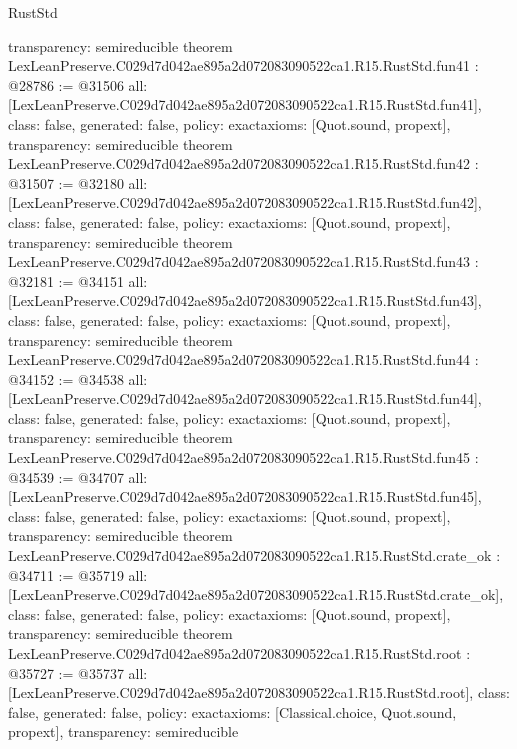 \begin{lexlean}{RustStd}
\begin{coremodule}
{  transparency: semireducible
}
theorem LexLeanPreserve.C029d7d042ae895a2d072083090522ca1.R15.RustStd.fun41 : @28786 := @31506 {
  all: [LexLeanPreserve.C029d7d042ae895a2d072083090522ca1.R15.RustStd.fun41],
  class: false,
  generated: false,
  policy: exact{axioms: [Quot.sound, propext]},
  transparency: semireducible
}
theorem LexLeanPreserve.C029d7d042ae895a2d072083090522ca1.R15.RustStd.fun42 : @31507 := @32180 {
  all: [LexLeanPreserve.C029d7d042ae895a2d072083090522ca1.R15.RustStd.fun42],
  class: false,
  generated: false,
  policy: exact{axioms: [Quot.sound, propext]},
  transparency: semireducible
}
theorem LexLeanPreserve.C029d7d042ae895a2d072083090522ca1.R15.RustStd.fun43 : @32181 := @34151 {
  all: [LexLeanPreserve.C029d7d042ae895a2d072083090522ca1.R15.RustStd.fun43],
  class: false,
  generated: false,
  policy: exact{axioms: [Quot.sound, propext]},
  transparency: semireducible
}
theorem LexLeanPreserve.C029d7d042ae895a2d072083090522ca1.R15.RustStd.fun44 : @34152 := @34538 {
  all: [LexLeanPreserve.C029d7d042ae895a2d072083090522ca1.R15.RustStd.fun44],
  class: false,
  generated: false,
  policy: exact{axioms: [Quot.sound, propext]},
  transparency: semireducible
}
theorem LexLeanPreserve.C029d7d042ae895a2d072083090522ca1.R15.RustStd.fun45 : @34539 := @34707 {
  all: [LexLeanPreserve.C029d7d042ae895a2d072083090522ca1.R15.RustStd.fun45],
  class: false,
  generated: false,
  policy: exact{axioms: [Quot.sound, propext]},
  transparency: semireducible
}
theorem LexLeanPreserve.C029d7d042ae895a2d072083090522ca1.R15.RustStd.crate_ok : @34711 := @35719 {
  all: [LexLeanPreserve.C029d7d042ae895a2d072083090522ca1.R15.RustStd.crate_ok],
  class: false,
  generated: false,
  policy: exact{axioms: [Quot.sound, propext]},
  transparency: semireducible
}
theorem LexLeanPreserve.C029d7d042ae895a2d072083090522ca1.R15.RustStd.root : @35727 := @35737 {
  all: [LexLeanPreserve.C029d7d042ae895a2d072083090522ca1.R15.RustStd.root],
  class: false,
  generated: false,
  policy: exact{axioms: [Classical.choice, Quot.sound, propext]},
  transparency: semireducible
}


\end{coremodule}
\end{lexlean}
